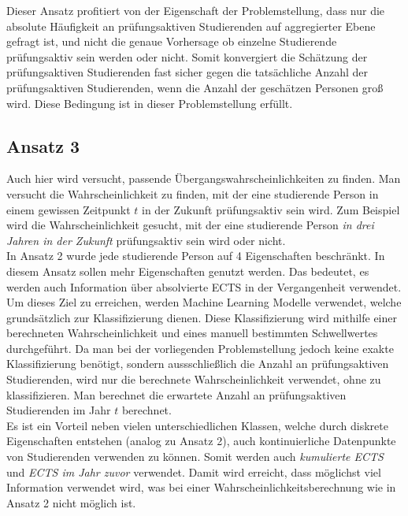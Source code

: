 Dieser Ansatz profitiert von der Eigenschaft der Problemstellung, dass nur die absolute H\"aufigkeit an pr\"ufungsaktiven Studierenden auf aggregierter Ebene
gefragt ist, und nicht die genaue Vorhersage ob einzelne Studierende pr\"ufungsaktiv sein werden oder nicht. 
Somit konvergiert die Sch\"atzung der pr\"ufungsaktiven Studierenden 
fast sicher gegen die tats\"achliche Anzahl der pr\"ufungsaktiven Studierenden, wenn die Anzahl der gesch\"atzen Personen gro{\ss} wird. Diese Bedingung ist in dieser Problemstellung
erf\"ullt. \\







\subsection{Ansatz 3}
\label{sec:appr3}

Auch hier wird versucht, passende \"Ubergangswahrscheinlichkeiten zu finden. Man versucht die Wahrscheinlichkeit zu finden, mit der eine studierende Person in einem 
gewissen Zeitpunkt $t$ in der Zukunft pr\"ufungsaktiv sein wird.
Zum Beispiel wird die Wahrscheinlichkeit gesucht, mit der eine studierende Person \textit{in drei Jahren in der Zukunft} pr\"ufungsaktiv sein wird oder nicht. \\


In Ansatz 2 wurde jede studierende Person auf 4 Eigenschaften beschr\"ankt. 
In diesem Ansatz sollen mehr Eigenschaften genutzt werden. Das bedeutet, es werden auch Information 
\"uber absolvierte ECTS in der Vergangenheit verwendet. \\


Um dieses Ziel zu erreichen, werden Machine Learning Modelle verwendet, welche grunds\"atzlich zur Klassifizierung dienen. 
Diese Klassifizierung wird mithilfe einer berechneten Wahrscheinlichkeit und eines manuell bestimmten Schwellwertes durchgef\"uhrt. 
Da man bei der vorliegenden Problemstellung jedoch keine exakte Klassifizierung ben\"otigt, sondern aussschlie{\ss}lich die Anzahl an 
pr\"ufungsaktiven Studierenden, wird nur die berechnete Wahrscheinlichkeit verwendet, ohne zu klassifizieren. Man berechnet die erwartete Anzahl an pr\"ufungsaktiven 
Studierenden im Jahr $t$ berechnet. \\

Es ist ein Vorteil neben vielen unterschiedlichen Klassen, welche durch diskrete Eigenschaften entstehen (analog zu Ansatz 2), auch kontinuierliche Datenpunkte von
Studierenden verwenden zu k\"onnen. Somit werden auch \textit{\glqq kumulierte ECTS\grqq{}} und \textit{\glqq ECTS im Jahr zuvor\grqq{}} verwendet. Damit wird erreicht, dass 
m\"oglichst viel Information verwendet wird, was bei einer Wahrscheinlichkeitsberechnung wie in Ansatz 2 nicht m\"oglich ist. \\

